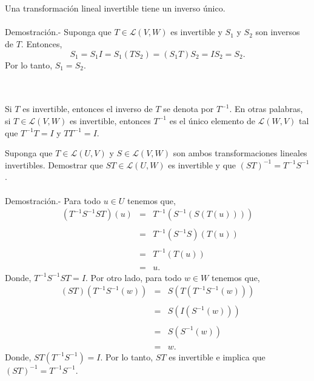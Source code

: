 \begin{myteo}\,\\\\
    Una transformación lineal invertible tiene un inverso único.\\\\
	Demostración.-\; Suponga que $T\in \mathcal{L}(V,W)$ es invertible y $S_1$ y $S_2$ son inversos de $T$. Entonces,
	$$S_1=S_1I=S_1(TS_2)=(S_1T)S_2=IS_2=S_2.$$
	Por lo tanto, $S_1=S_2$.
\end{myteo}

\begin{mynotacion}[\boldmath$T^{-1}$]\,\\\\
    Si $T$ es invertible, entonces el inverso de $T$ se denota por $T^{-1}$. En otras palabras, si $T\in \mathcal{L}(V,W)$ es invertible, entonces $T^{-1}$ es el único elemento de $\mathcal{L}(W,V)$ tal que $T^{-1}T=I$ y $TT^{-1}=I.$
\end{mynotacion}

\begin{lema}
    Suponga que $T\in \mathcal{L}(U,V)$ y $S\in \mathcal{L}(V,W)$ son ambos transformaciones lineales invertibles. Demostrar que $ST\in \mathcal{L}(U,W)$ es invertible y que $(ST)^{-1}=T^{-1}S^{-1}$.\\\\
	Demostración.-\; Para todo $u\in U$ tenemos que,
	$$
	\begin{array}{rcl}
	    (T^{-1}S^{-1}ST)(u) & = & T^{-1}(S^{-1}(S(T(u))))\\\\
				&=& T^{-1}(S^{-1}S)(T(u))\\\\
				&=& T^{-1}(T(u))\\\\
				&=& u.
	\end{array}
	$$
	Donde, $T^{-1}S^{-1}ST=I$. Por otro lado, para todo $w\in W$ tenemos que,
	$$
	\begin{array}{rcl}
	    (ST)(T^{-1}S^{-1}(w)) & = & S(T(T^{-1}S^{-1}(w)))\\\\
				  & = & S(I(S^{-1}(w)))\\\\
				  & = & S(S^{-1}(w))\\\\
				  & = & w.
	\end{array}
	$$
	Donde, $ST(T^{-1}S^{-1})=I$. Por lo tanto, $ST$ es invertible e implica que $(ST)^{-1}=T^{-1}S^{-1}$.
\end{lema}

